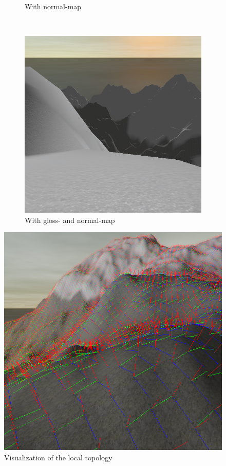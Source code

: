 \documentclass{article}
\begin{document}
\begin{figure}[H]
\begin{subfigure}[b]{0.45\textwidth}
        \caption{With normal-map}
        \label{fig:normalMap}
    \end{subfigure}
    ~
    \begin{subfigure}[b]{0.45\textwidth}
        \centering
        \includegraphics[scale=0.25]{glossNormalMap}
        \caption{With gloss- and normal-map}
        \label{fig:glossNormalMap}
    \end{subfigure}
    \caption{}
    \label{fig:tangentSpaceSnow}
\end{figure}

\begin{figure}[H]
\centering
    \centering
    \includegraphics[scale=0.5]{tangentSpaceViz}
    \caption{Visualization of the local topology}
    \label{fig:tangentSpaceViz}
\end{figure}
\end{document}
